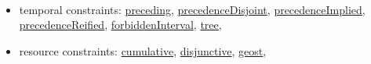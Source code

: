 \vspace{1em}\noindent\begin{notedef}\tt
   \begin{itemize}
   \item temporal constraints: 
\hyperlink{preceding:precedingconstraint}{preceding}, 
\hyperlink{precedencedisjoint:precedencedisjointconstraint}{precedenceDisjoint}, 
\hyperlink{precedenceimplied:precedenceimpliedconstraint}{precedenceImplied}, 
\hyperlink{precedencereified:precedencereifiedconstraint}{precedenceReified},
\hyperlink{forbiddeninterval:forbiddenintervalconstraint}{forbiddenInterval},
\hyperlink{tree:treeconstraint}{tree},
   \item resource constraints: 
\hyperlink{cumulative:cumulativeconstraint}{cumulative}, 
\hyperlink{disjunctive:disjunctiveconstraint}{disjunctive}, 
\hyperlink{geost:geostconstraint}{geost}, 
 \end{itemize}
\end{notedef}
